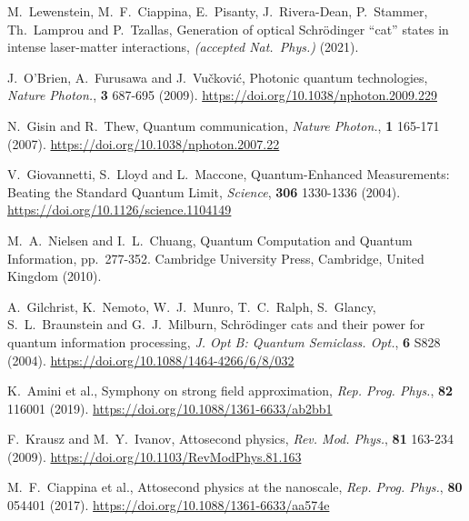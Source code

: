 \begin{thebibliography}{}
%
%

M.\ Lewenstein, M.\ F.\ Ciappina, E.\ Pisanty, J.\ Rivera-Dean, P.\ Stammer, Th.\ Lamprou and P.\ Tzallas, Generation of optical Schrödinger ``cat'' states in intense laser-matter interactions, \emph{(accepted Nat.\ Phys.)} (2021).

    J.\ O'Brien, A.\ Furusawa and J.\ Vu\v{c}kovi\'c, Photonic quantum technologies, \emph{Nature Photon.}, \textbf{3} 687-695 (2009). \url{https://doi.org/10.1038/nphoton.2009.229}

    N.\ Gisin and R.\ Thew, Quantum communication, \emph{Nature Photon.}, \textbf{1} 165-171 (2007). \url{https://doi.org/10.1038/nphoton.2007.22}

    V.\ Giovannetti, S.\ Lloyd and L.\ Maccone, Quantum-Enhanced Measurements: Beating the Standard Quantum Limit, \emph{Science}, \textbf{306} 1330-1336 (2004).     \url{https://doi.org/10.1126/science.1104149}

    M.\ A.\ Nielsen and I.\ L.\ Chuang, Quantum Computation and Quantum Information, pp.\ 277-352. Cambridge University Press, Cambridge, United Kingdom (2010).
  
    A.\ Gilchrist, K.\ Nemoto, W.\ J.\ Munro, T.\ C.\ Ralph, S.\ Glancy, S.\ L.\ Braunstein and G.\ J.\ Milburn, Schrödinger cats and their power for quantum information processing, \emph{J. Opt B: Quantum Semiclass. Opt.}, \textbf{6} S828 (2004). \url{https://doi.org/10.1088/1464-4266/6/8/032}

    K.\ Amini et al., Symphony on strong field approximation, \emph{Rep. Prog. Phys.}, \textbf{82} 116001 (2019). \url{https://doi.org/10.1088/1361-6633/ab2bb1}

    F.\ Krausz and M.\ Y.\ Ivanov, Attosecond physics, \emph{Rev. Mod. Phys.}, \textbf{81} 163-234 (2009). \url{https://doi.org/10.1103/RevModPhys.81.163}

    M.\ F.\ Ciappina et al., Attosecond physics at the nanoscale, \emph{Rep. Prog. Phys.}, \textbf{80} 054401 (2017). \url{https://doi.org/10.1088/1361-6633/aa574e}



\end{thebibliography}
